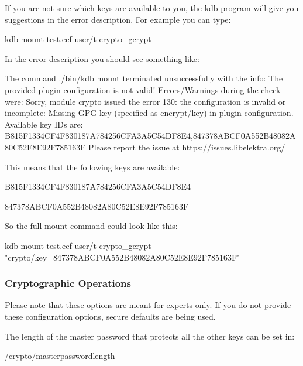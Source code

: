 If you are not sure which keys are available to you, the {\ttfamily kdb} program will give you suggestions in the error description. For example you can type\+:


\begin{DoxyCode}
kdb mount test.ecf user/t crypto\_gcrypt
\end{DoxyCode}


In the error description you should see something like\+:


\begin{DoxyCode}
The command ./bin/kdb mount terminated unsuccessfully with the info:
The provided plugin configuration is not valid!
Errors/Warnings during the check were:
Sorry, module crypto issued the error 130:
the configuration is invalid or incomplete: Missing GPG key (specified as encrypt/key) in plugin
       configuration. Available key IDs are:
       B815F1334CF4F830187A784256CFA3A5C54DF8E4,847378ABCF0A552B48082A80C52E8E92F785163F
Please report the issue at https://issues.libelektra.org/
\end{DoxyCode}


This means that the following keys are available\+:


\begin{DoxyItemize}
\item B815\+F1334\+C\+F4\+F830187\+A784256\+C\+F\+A3\+A5\+C54\+D\+F8\+E4
\item 847378\+A\+B\+C\+F0\+A552\+B48082\+A80\+C52\+E8\+E92\+F785163F
\end{DoxyItemize}

So the full mount command could look like this\+:


\begin{DoxyCode}
kdb mount test.ecf user/t crypto\_gcrypt "crypto/key=847378ABCF0A552B48082A80C52E8E92F785163F"
\end{DoxyCode}


\subsubsection*{Cryptographic Operations}

Please note that these options are meant for experts only. If you do not provide these configuration options, secure defaults are being used.

The length of the master password that protects all the other keys can be set in\+:


\begin{DoxyCode}
/crypto/masterpasswordlength
\end{DoxyCode}


